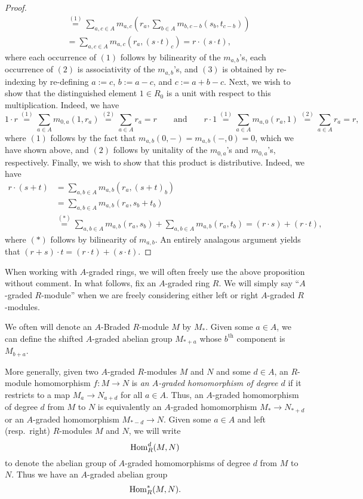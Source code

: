 \documentclass[../main.tex]{subfiles}
\begin{document}
\begin{proof}
\begin{align*}
		&\overset{(1)}=\sum_{a,c\in A}m_{a,c}\left(r_a,\sum_{b\in A}m_{b,c-b}(s_b,t_{c-b})\right) \\
		&=\sum_{a,c\in A}m_{a,c}(r_a,(s\cdot t)_c)=r\cdot(s\cdot t),
	\end{align*}
	where each occurrence of $(1)$ follows by bilinearity of the $m_{a,b}$'s, each occurrence of $(2)$ is associativity of the $m_{a,b}$'s, and $(3)$ is obtained by re-indexing by re-defining $a:=c$, $b:=a-c$, and $c:=a+b-c$. Next, we wish to show that the distinguished element $1\in R_0$ is a unit with respect to this multiplication. Indeed, we have
	\[1\cdot r\overset{(1)}=\sum_{a\in A}m_{0,a}(1,r_a)\overset{(2)}=\sum_{a\in A}r_a=r\qquad\text{and}\qquad r\cdot 1\overset{(1)}=\sum_{a\in A}m_{a,0}(r_a,1)\overset{(2)}=\sum_{a\in A}r_a=r,\]
	where $(1)$ follows by the fact that $m_{a,b}(0,-)=m_{a,b}(-,0)=0$, which we have shown above, and $(2)$ follows by unitality of the $m_{0,a}$'s and $m_{0,a}$'s, respectively. Finally, we wish to show that this product is distributive. Indeed, we have
	\begin{align*}
		r\cdot(s+t)&=\sum_{a,b\in A}m_{a,b}(r_a,(s+t)_b) \\
		&=\sum_{a,b\in A}m_{a,b}(r_a,s_b+t_b) \\
		&\overset{(*)}=\sum_{a,b\in A}m_{a,b}(r_a,s_b)+\sum_{a,b\in A}m_{a,b}(r_a,t_b)=(r\cdot s)+(r\cdot t),
	\end{align*}
	where $(*)$ follows by bilinearity of $m_{a,b}$. An entirely analagous argument yields that $(r+s)\cdot t=(r\cdot t)+(s\cdot t)$.
\end{proof}

When working with $A$-graded rings, we will often freely use the above proposition without comment. In what follows, fix an $A$-graded ring $R$. We will simply say ``$A$-graded $R$-module'' when we are freely considering either left or right $A$-graded $R$-modules.

\begin{remark}
	We often will denote an $A$-Braded $R$-module $M$ by $M_*$. Given some $a\in A$, we can define the shifted $A$-graded abelian group $M_{*+a}$ whose $b^\text{th}$ component is $M_{b+a}$.
\end{remark}

\begin{definition}
    More generally, given two $A$-graded $R$-modules $M$ and $N$ and some $d\in A$, an $R$-module homomorphism $f:M\to N$ is \emph{an $A$-graded homomorphism of degree $d$} if it restricts to a map $M_a\to N_{a+d}$ for all $a\in A$. Thus, an $A$-graded homomorphism of degree $d$ from $M$ to $N$ is equivalently an $A$-graded homomorphism $M_*\to N_{*+d}$ or an $A$-graded homomorphism $M_{*-d}\to N$. Given some $a\in A$ and left (resp.\ right) $R$-modules $M$ and $N$, we will write 
	\[\mathrm{Hom}_R^d(M,N)\]
	to denote the abelian group of $A$-graded homomorphisms of degree $d$ from $M$ to $N$. Thus we have an $A$-graded abelian group
	\[\mathrm{Hom}_R^*(M,N).\]
\end{definition}
\end{document}
